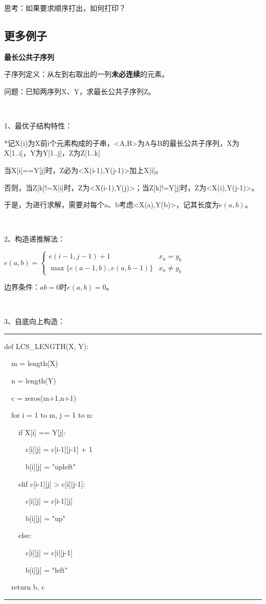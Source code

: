 \documentclass[a4paper,UTF8,fontset=windows]{ctexart}
\newenvironment{code}{\rule{36em}{0.1em}\setlength{\parindent}{1em}

}{

\setlength{\parindent}{0em}\rule{36em}{0.1em}}
\begin{document}
思考：如果要求顺序打出，如何打印？

\subsection{更多例子}
\textbf{最长公共子序列}

子序列定义：从左到右取出的一列\textbf{未必连续}的元素。

问题：已知两序列X、Y，求最长公共子序列Z。

\

1、最优子结构特性：

*\hspace{0em}记X(i)为X前i个元素构成的子串，<A,B>为A与B的最长公共子序列，X为X[1..i]，Y为Y[1..j]，Z为Z[1..k]

当X[i]==Y[j]时，Z必为<X(i-1),Y(j-1)>加上X[i]。

否则，当Z[k]!=X[i]时，Z为<X(i-1),Y(j)>；当Z[k]!=Y[j]时，Z为<X(i),Y(j-1)>。

于是，为进行求解，需要对每个a、b考虑<X(a),Y(b)>，记其长度为$e(a,b)$。

\

2、构造递推解法：

$e(a,b)=\begin{cases}e(i-1,j-1)+1&x_a=y_b\\\max\{e(a-1,b),e(a,b-1)\}&x_a\ne y_b\end{cases}$

边界条件：$ab=0$时$e(a,b)=0$。

\

3、自底向上构造：

\begin{code}
def LCS\_LENGTH(X, Y):

\ \ m = length(X)

\ \ n = length(Y)

\ \ c = zeros(m+1,n+1)

\ \ for i = 1 to m, j = 1 to n:

\ \ \ \ if X[i] == Y[j]:

\ \ \ \ \ \ c[i][j] = c[i-1][j-1] + 1

\ \ \ \ \ \ b[i][j] = "upleft"

\ \ \ \ elif c[i-1][j] > c[i][j-1]:

\ \ \ \ \ \ c[i][j] = c[i-1][j]

\ \ \ \ \ \ b[i][j] = "up"

\ \ \ \ else:

\ \ \ \ \ \ c[i][j] = c[i][j-1]

\ \ \ \ \ \ b[i][j] = "left"

\ \ return b, c
\end{code}
\end{document}
